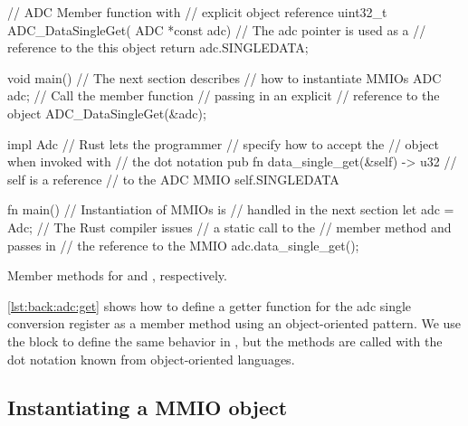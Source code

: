 \begin{listing}[H]
  \centering
  \begin{minipage}{0.47\textwidth}
  \begin{listing}
      \begin{ccode}
// ADC Member function with
// explicit object reference
uint32_t ADC_DataSingleGet(
           ADC *const adc) {
  // The adc pointer is used as a
  // reference to the this object
  return adc.SINGLEDATA;
}

void main() {
  // The next section describes
  // how to instantiate MMIOs
  ADC adc;
  // Call the member function
  // passing in an explicit
  // reference to the object
  ADC_DataSingleGet(&adc);
}
      \end{ccode}
  \end{listing}
  \end{minipage}
  \hfill
  \begin{minipage}{0.47\textwidth}
  \begin{listing}
      \begin{rustcode}
impl Adc {
  // Rust lets the programmer
  // specify how to accept the
  // object when invoked with
  // the dot notation
  pub fn data_single_get(&self)
  -> u32 { // self is a reference
    // to the ADC MMIO
    self.SINGLEDATA
  }
}

fn main() {
  // Instantiation of MMIOs is
  // handled in the next section
  let adc = Adc;
  // The Rust compiler issues
  // a static call to the
  // member method and passes in
  // the reference to the MMIO
  adc.data_single_get();
}
      \end{rustcode}
  \end{listing}
  \end{minipage}
  \caption{Member methods for {\C} and {\rust}, respectively.}
  \label{lst:back:adc:get}

\end{listing}

\autoref{lst:back:adc:get} shows how to define a getter function for the \gls{adc} single conversion register as a member method using an object-oriented pattern.
We use the  block to define the same behavior in {\rust}, but the methods are called with the dot notation known from object-oriented languages.

\subsection{Instantiating a MMIO object}

